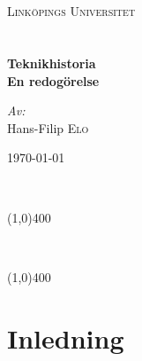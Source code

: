 \documentclass[a4paper,12pt,fleqn]{article}
\begin{document}
\onehalfspacing

\begin{titlepage}
\begin{center}


~\\
~\\
\textsc{\LARGE Link{\"o}pings Universitet}\\[1.5cm]


~\\
~\\
{ \huge \bfseries Teknikhistoria \\ En redogörelse \\[0.4cm] }

\large
\emph{Av:}\\
Hans-Filip \textsc{Elo}

\vfill

{\large \today}

\end{center}


\newpage
\thispagestyle{empty}
\tableofcontents
~\\

\begin{center}
\line(1,0){400}
\end{center}

\listoffigures
~\\

\begin{center}
\line(1,0){400}
\end{center}

\listoftables

\end{titlepage}

\pagestyle{fancy}

\fancyhead{} %


\section{Inledning}
\end{document}
